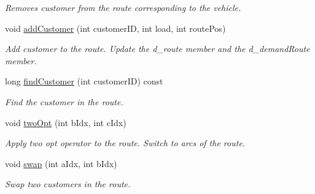 \begin{DoxyCompactItemize}
\begin{DoxyCompactList}\small\item\em Removes customer from the route corresponding to the vehicle. \end{DoxyCompactList}\item 
void \hyperlink{class_route_a21490cdf3853d449a2608432596ff622}{add\+Customer} (int customer\+ID, int load, int route\+Pos)
\begin{DoxyCompactList}\small\item\em Add customer to the route. Update the d\+\_\+route member and the d\+\_\+demand\+Route member. \end{DoxyCompactList}\item 
long \hyperlink{class_route_ae8402085cd8be017e3ac15fd8b3a05fd}{find\+Customer} (int customer\+ID) const
\begin{DoxyCompactList}\small\item\em Find the customer in the route. \end{DoxyCompactList}\item 
void \hyperlink{class_route_a7e21fdad3d0539f54a1cefa7b046ab49}{two\+Opt} (int b\+Idx, int c\+Idx)
\begin{DoxyCompactList}\small\item\em Apply two opt operator to the route. Switch to arcs of the route. \end{DoxyCompactList}\item 
void \hyperlink{class_route_a463c649701eb3ed5c659f5e920460335}{swap} (int a\+Idx, int b\+Idx)
\begin{DoxyCompactList}\small\item\em Swap two customers in the route. \end{DoxyCompactList}\end{DoxyCompactItemize}

